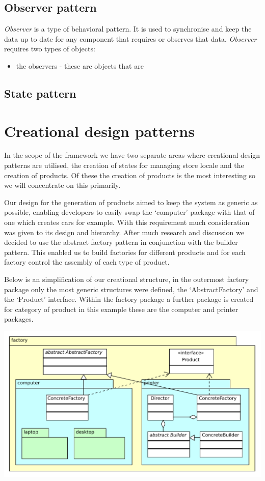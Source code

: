 \documentclass[pdftex,11pt,a4paper]{article}
\begin{document}
\subsection{Observer pattern}
\emph{Observer} is a type of behavioral pattern. It is used to synchronise and keep the data up to date for any component that requires or observes that data. \emph{Observer} requires two types of objects:
\begin{itemize}
	\item the observers - these are objects that are 
\end{itemize}
\subsection{State pattern}
\pagebreak

\section{Creational design patterns}
In the scope of the framework we have two separate areas where creational design patterns are utilised, the creation of states for managing store locale and the creation of products. Of these the creation of products is the most interesting so we will concentrate on this primarily.

Our design for the generation of products aimed to keep the system as generic as possible, enabling developers to easily swap the ‘computer’ package with that of one which creates cars for example. With this requirement much consideration was given to its design and hierarchy. After much research and discussion we decided to use the abstract factory pattern in conjunction with the builder pattern. This enabled us to build factories for different products and for each factory control the assembly of each type of product.

Below is an simplification of our creational structure, in the outermost factory package only the most generic structures were defined, the ‘AbstractFactory’ and the ‘Product’ interface. Within the factory package a further package is created for category of product in this example these are the computer and printer packages.

\begin{center}
	\includegraphics[scale=0.75]{images/creational_diagram.pdf}
\end{center}
\end{document}
